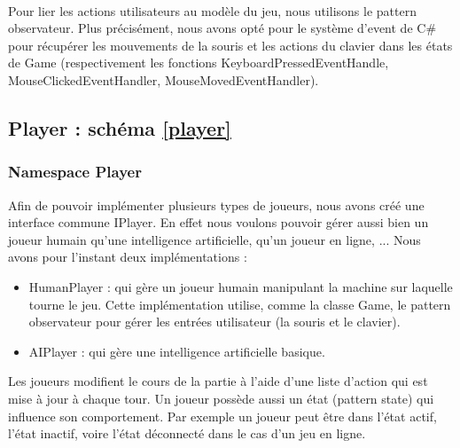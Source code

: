				\paragraph{}
				Pour lier les actions utilisateurs au modèle du jeu, nous utilisons le pattern observateur. Plus précisément, nous avons opté pour le système d'event de C\#	pour récupérer les mouvements de la souris et les actions du clavier dans les états de Game (respectivement les fonctions KeyboardPressedEventHandle,  MouseClickedEventHandler, MouseMovedEventHandler).
			
			\subsection{Player : schéma \ref{player}}
				\subsubsection{Namespace Player}
				Afin de pouvoir implémenter plusieurs types de joueurs, nous avons créé une interface commune IPlayer. 
				En effet nous voulons pouvoir gérer aussi bien un joueur humain qu'une intelligence artificielle, qu'un joueur en ligne, ...
				Nous avons pour l'instant deux implémentations :
					\begin{itemize}
					\item HumanPlayer : qui gère un joueur humain manipulant la machine sur laquelle tourne le jeu. 
Cette implémentation utilise, comme la classe Game, le pattern observateur pour gérer les entrées utilisateur (la souris et le clavier).
					\item AIPlayer : qui gère une intelligence artificielle basique.
					\end{itemize}
Les joueurs modifient le cours de la partie à l'aide d'une liste d'action qui est mise à jour à chaque tour.
Un joueur possède aussi un état (pattern state) qui influence son comportement. Par exemple un joueur peut être dans l'état actif, l'état inactif,
voire l'état déconnecté dans le cas d'un jeu en ligne. 
					
